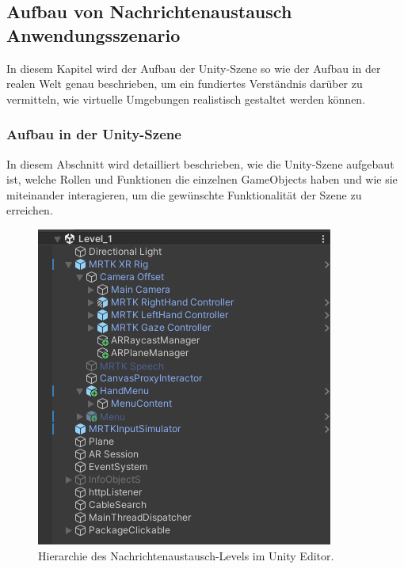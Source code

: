 \subsection{Aufbau von Nachrichtenaustausch Anwendungsszenario}
In diesem Kapitel wird der Aufbau der Unity-Szene so wie der Aufbau in der realen Welt genau beschrieben, um ein fundiertes Verständnis darüber zu vermitteln, wie virtuelle Umgebungen realistisch gestaltet werden können.
\subsubsection{Aufbau in der Unity-Szene}

In diesem Abschnitt wird detailliert beschrieben, wie die Unity-Szene aufgebaut ist, welche Rollen und Funktionen die einzelnen GameObjects  haben und wie sie miteinander interagieren, um die gewünschte Funktionalität der Szene zu erreichen.
\begin{figure}[H]
    \centering
    \includegraphics[scale=1]{images/Level1Hierarchy.png}
    \caption{Hierarchie des Nachrichtenaustausch-Levels im Unity Editor.}
    \label{fig:level1Hierarchy}
\end{figure}
